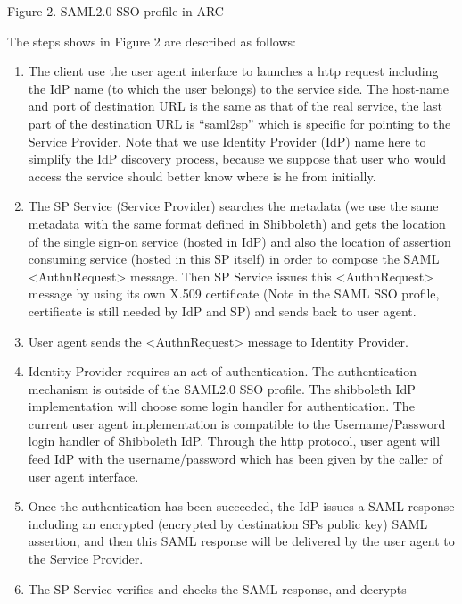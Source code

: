 \documentclass{article}
\newcommand\liststyleLv{%
\renewcommand\theenumi{\arabic{enumi}}
\renewcommand\theenumii{\arabic{enumii}}
\renewcommand\theenumiii{\arabic{enumiii}}
\renewcommand\theenumiv{\arabic{enumiv}}
\renewcommand\labelenumi{\theenumi.}
\renewcommand\labelenumii{\theenumii.}
\renewcommand\labelenumiii{\theenumiii.}
\renewcommand\labelenumiv{\theenumiv.}
}
\begin{document}
\bigskip

{\centering
Figure 2. SAML2.0 SSO profile in ARC
\par}

The steps shows in Figure 2 are described as follows:

\liststyleLv
\begin{enumerate}
\item The client use the user agent interface to launches a http request
including the IdP name (to which the user belongs) to the service side.
The host-name and port of destination URL is the same as that of the
real service, the last part of the destination URL is
{\textquotedblleft}saml2sp{\textquotedblright} which is specific for
pointing to the Service Provider. Note that we use Identity Provider
(IdP) name here to simplify the IdP discovery process, because we
suppose that user who would access the service should better know where
is he from initially.
\item The SP Service (Service Provider) searches the metadata (we use
the same metadata with the same format defined in Shibboleth) and gets
the location of the single sign-on service (hosted in IdP) and also the
location of assertion consuming service (hosted in this SP itself) in
order to compose the SAML {\textless}AuthnRequest{\textgreater}
message. Then SP Service issues this
{\textless}AuthnRequest{\textgreater} message by using its own X.509
certificate (Note in the SAML SSO profile, certificate is still needed
by IdP and SP) and sends back to user agent.
\item User agent sends the {\textless}AuthnRequest{\textgreater} message
to Identity Provider.
\item Identity Provider requires an act of authentication. The
authentication mechanism is outside of the SAML2.0 SSO profile. The
shibboleth IdP implementation will choose some login handler for
authentication. The current user agent implementation is compatible to
the Username/Password login handler of Shibboleth IdP. Through the http
protocol, user agent will feed IdP with the username/password which has
been given by the caller of user agent interface.
\item Once the authentication has been succeeded, the IdP issues a SAML
response including an encrypted (encrypted by destination
SP{\textquotesingle}s public key) SAML assertion, and then this SAML
response will be delivered by the user agent to the Service Provider. 
\item The SP Service verifies and checks the SAML response, and decrypts

\end{enumerate}
\end{document}
